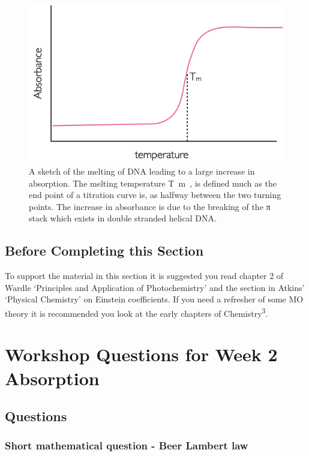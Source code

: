 \documentclass[
]{book}
\begin{document}
\begin{figure}

{\centering \includegraphics[width=0.6\linewidth]{images/DNAmelt} 

}

\caption{A sketch of the melting of DNA leading to a large increase in absorption. The melting temperature T~m~, is defined much as the end point of a titration curve is, as halfway between the two turning points. The increase in absorbance is due to the breaking of the π stack which exists in double stranded helical DNA.}\label{fig:DNAmelt}
\end{figure}

\hypertarget{sec:before1}{%
\section{Before Completing this Section}\label{sec:before1}}

To support the material in this section it is suggested you read chapter 2 of Wardle `Principles and Application of Photochemistry' and the section in Atkins' `Physical Chemistry' on Einstein coefficients. If you need a refresher of some MO theory it is recommended you look at the early chapters of Chemistry\textsuperscript{3}.

\hypertarget{ch:Workshop1}{%
\chapter{Workshop Questions for Week 2 Absorption}\label{ch:Workshop1}}

\hypertarget{sec:absquestions}{%
\section{Questions}\label{sec:absquestions}}

\hypertarget{subsec:BeerLambertSAQ}{%
\subsection{Short mathematical question - Beer Lambert law}\label{subsec:BeerLambertSAQ}}
\end{document}
